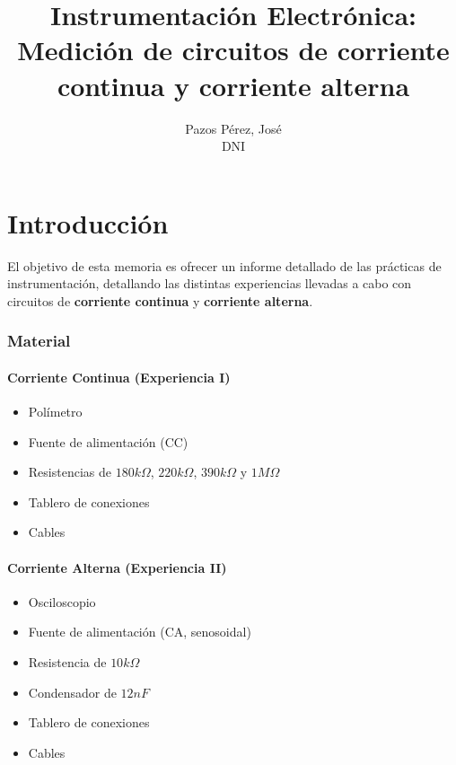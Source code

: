\documentclass[12pt, a4paper, titlepage]{article}
\title{\textbf {Instrumentación Electrónica: Medición de circuitos de corriente continua y corriente alterna}}
\author{{\Large Pazos Pérez, José}\\DNI}
\date{}
\begin{document}
  \maketitle

  \tableofcontents

  \newpage
  \part*{Introducción}

  El objetivo de esta memoria es ofrecer un informe detallado de las prácticas de instrumentación, detallando las distintas experiencias llevadas a cabo con circuitos de \textbf{corriente continua} y \textbf{corriente alterna}.

  \section{Material}

  \subsection{Corriente Continua (Experiencia I)}

  \begin{itemize}[label=$-$]
    \item Polímetro
    \item Fuente de alimentación (CC)
    \item Resistencias de $180k\Omega$, $220k\Omega$, $390k\Omega$ y $1M\Omega$
    \item Tablero de conexiones
    \item Cables
  \end{itemize}

  \subsection{Corriente Alterna (Experiencia II)}
  \begin{itemize}[label=$-$]
    \item Osciloscopio
    \item Fuente de alimentación (CA, senosoidal)
    \item Resistencia de $10k\Omega$
    \item Condensador de $12nF$
    \item Tablero de conexiones
    \item Cables
  \end{itemize}
\end{document}
